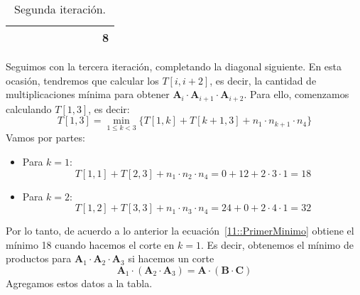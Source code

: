 \begin{ejemplo}
\begin{table}[ht]
\begin{tabular}{*{8}{M|}M|}
			   &   &    &	 &    &	   &	 &    &	  8 \\
	\hline
      \end{tabular}
      \caption{Segunda iteración.}
      \label{11::Iteracion2}
    \end{table}
    Seguimos con la tercera iteración,
    completando la diagonal siguiente.
    En esta ocasión,
    tendremos que calcular los \(T[i, i + 2]\),
    es decir,
    la cantidad de multiplicaciones mínima
    para obtener
      \(\mathbf{A}_i \cdot \mathbf{A}_{i + 1} \cdot \mathbf{A}_{i + 2}\).
    Para ello,
    comenzamos calculando \(T[1, 3]\),
    es decir:
    \begin{equation}
      \label{11::PrimerMinimo}
      T[1, 3]
	= \min_{1 \le k < 3} \{ T[1, k] + T[k + 1, 3]
				 + n_1 \cdot n_{k + 1} \cdot n_4 \}
    \end{equation}
    Vamos por partes:
    \begin{itemize}
    \item
      Para \(k = 1\):
      \begin{equation*}
	T[1, 1] + T[2, 3] + n_1 \cdot n_2 \cdot n_4
	  = 0 + 12 + 2 \cdot 3 \cdot 1
	  = 18
      \end{equation*}
    \item
      Para \(k = 2\):
      \begin{equation*}
	T[1, 2] + T[3, 3]
	       + n_1 \cdot n_3 \cdot n_4
	  = 24 + 0 + 2 \cdot 4 \cdot 1
	  = 32
      \end{equation*}
    \end{itemize}
    Por lo tanto,
    de acuerdo a lo anterior la ecuación~\eqref{11::PrimerMinimo}
    obtiene el mínimo \num{18} cuando hacemos el corte en \(k = 1\).
    Es decir,
    obtenemos el mínimo de productos
    para \(\mathbf{A}_1 \cdot \mathbf{A}_2 \cdot \mathbf{A}_3\)
    si hacemos un corte
    \begin{equation}
      \mathbf{A}_1 \cdot (\mathbf{A}_2\cdot \mathbf{A}_3)
	= \mathbf{A} \cdot (\mathbf{B} \cdot \mathbf{C})
    \end{equation}
    Agregamos estos datos a la tabla.


\end{ejemplo}
